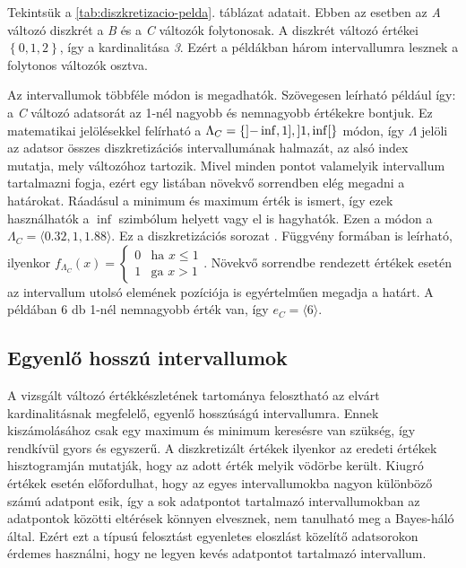 Tekintsük a \ref{tab:diszkretizacio-pelda}. táblázat adatait. Ebben az esetben az \emph{A} változó diszkrét a \emph{B} és a \emph{C} változók folytonosak. A diszkrét változó értékei $\left\{ 0, 1, 2 \right\}$, így a kardinalitása \emph{3}. Ezért a példákban három intervallumra lesznek a folytonos változók osztva.

Az intervallumok többféle módon is megadhatók. Szövegesen leírható például így: a \emph{C} változó adatsorát az 1-nél nagyobb és nemnagyobb értékekre bontjuk. Ez matematikai jelölésekkel felírható a $\Lambda_{C} = \left\{ \interval[open left]{-\inf}{1}, \interval[open]{1}{\inf} \right\} $ módon, így $\Lambda$ jelöli az adatsor összes diszkretizációs intervallumának halmazát, az alsó index mutatja, mely változóhoz tartozik. Mivel minden pontot valamelyik intervallum tartalmazni fogja, ezért egy listában növekvő sorrendben elég megadni a határokat. Ráadásul a minimum és maximum érték is ismert, így ezek használhatók a $\inf$ szimbólum helyett vagy el is hagyhatók. Ezen a módon a $\Lambda_{C} = \langle 0.32, 1, 1.88 \rangle$. Ez a diszkretizációs sorozat \cite{friedman1996discretizing}. Függvény formában is leírható, ilyenkor
$f_{\Lambda_{C}}(x) = \left\{ \begin{array}{ll}
    0 & \mbox{ha } x \leq 1 \\
    1 & \mbox{ga } x > 1
\end{array} \right.$. Növekvő sorrendbe rendezett értékek esetén az intervallum utolsó elemének pozíciója is egyértelműen megadja a határt. A példában 6 db 1-nél nemnagyobb érték van, így $e_{C} = \langle 6 \rangle$.

\subsection{Egyenlő hosszú intervallumok}
A vizsgált változó értékkészletének tartománya felosztható az elvárt kardinalitásnak megfelelő, egyenlő hosszúságú intervallumra. Ennek kiszámolásához csak egy maximum és minimum keresésre van szükség, így rendkívül gyors és egyszerű. A diszkretizált értékek ilyenkor az eredeti értékek hisztogramján mutatják, hogy az adott érték melyik vödörbe került. Kiugró értékek esetén előfordulhat, hogy az egyes intervallumokba nagyon különböző számú adatpont esik, így a sok adatpontot tartalmazó intervallumokban az adatpontok közötti eltérések könnyen elvesznek, nem tanulható meg a Bayes-háló által. Ezért ezt a típusú felosztást egyenletes eloszlást közelítő adatsorokon érdemes használni, hogy ne legyen kevés adatpontot tartalmazó intervallum.

